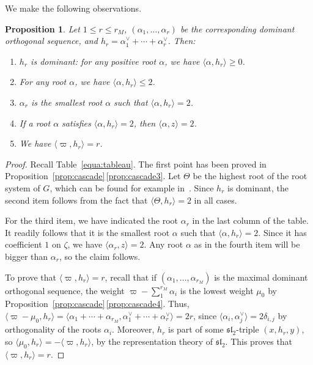 \documentclass[10pt]{amsart}
\let\oldvee\vee
\renewcommand{\vee}{{\scriptscriptstyle\oldvee}}
\theoremstyle{plain}
\newtheorem{prop}[theo]{Proposition}
\theoremstyle{definition}
\newcommand{\fsl}{\mathfrak{sl}}
\newcommand{\rkm}{{r_M}}
\newcommand{\scal}[1]{\langle #1 \rangle}
\begin{document}
We make the following observations.

\begin{prop}\label{prop:h}
Let $1\leq r\leq \rkm$, $(\alpha_1,\ldots,\alpha_r)$ be the corresponding dominant orthogonal
sequence, and $h_r=\alpha_1^\vee + \cdots + \alpha_r^\vee$. Then:
\begin{enumerate}
\item \label{item:dominant} $h_r$ is dominant: for any positive root $\alpha$, we have $\scal{\alpha,h_r} \geq 0$.
\item \label{item:leq2} For any root $\alpha$, we have $\scal{\alpha,h_r} \leq 2$.
\item \label{item:smallest} $\alpha_r$ is the smallest root $\alpha$ such that $\scal{\alpha,h_r}=2$.
\item \label{item:scal} If a root $\alpha$ satisfies $\scal{\alpha,h_r} = 2$, then $\scal{\alpha,z}=2$.
\item \label{item:varpi} We have $\scal{\varpi,h_r}=r$.
\end{enumerate}
\end{prop}

\begin{proof}
Recall Table~\ref{equa:tableau}. The first point has been proved in Proposition~\ref{prop:cascade}\,\eqref{prop:cascade3}.
Let $\Theta$ be the highest root of the root system of $G$,
which can be found for example in~\cite{bourbaki}.
Since $h_r$ is dominant, the second item follows from the
fact that $\scal{\Theta,h_r}=2$ in all cases.

For the third item, we have indicated the root $\alpha_r$ in the last column of the table. It
readily follows that it is the smallest root $\alpha$ such that $\scal{\alpha,h_r}=2$.
Since it has coefficient $1$ on $\zeta$, we have $\scal{\alpha_r,z}=2$. Any root $\alpha$ as in
the fourth item will be bigger than $\alpha_r$, so the claim follows.

To prove that $\scal{\varpi,h_r}=r$, recall that if $(\alpha_1,\ldots,\alpha_\rkm)$ is the maximal dominant
orthogonal sequence, the weight
$\varpi- \sum_1^\rkm \alpha_i$ is the lowest weight $\mu_0$ by Proposition~\ref{prop:cascade}\,\eqref{prop:cascade4}. Thus,
$\scal{\varpi-\mu_0,h_r} = \scal{\alpha_1+\cdots+\alpha_\rkm,\alpha_1^\vee+\cdots+\alpha_r^\vee}=2r$,
since $\scal{\alpha_i,\alpha_j^\vee}=2\delta_{i,j}$ by orthogonality of the roots $\alpha_i$.
Moreover, $h_r$ is part of some $\fsl_2$\nobreakdash-triple $(x, h_r,y)$, so
$\scal{\mu_0, h_r}=-\scal{\varpi, h_r}$, by the representation theory of $\fsl_2$.
This proves that $\scal{\varpi, h_r}=r$.
\end{proof}
\end{document}
